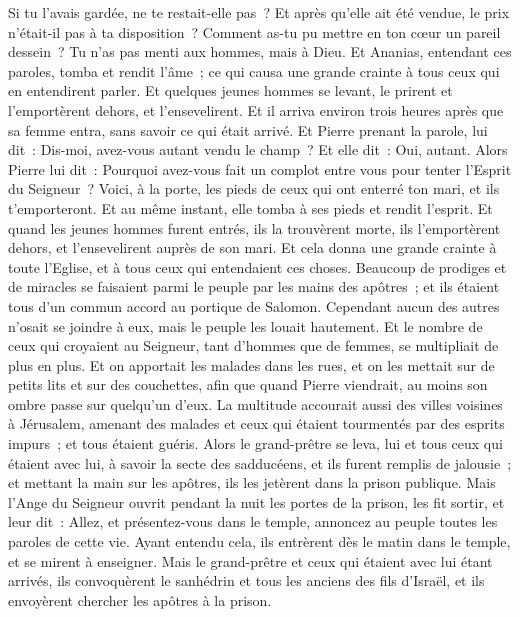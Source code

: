 \begin{multicols}{2}
Si tu l'avais gardée, ne te restait-elle pas~? Et après qu'elle ait été vendue, le prix n'était-il pas à ta disposition~? Comment as-tu pu mettre en ton cœur un pareil dessein~? Tu n'as pas menti aux hommes, mais à Dieu.
Et Ananias, entendant ces paroles, tomba et rendit l'âme~; ce qui causa une grande crainte à tous ceux qui en entendirent parler.
Et quelques jeunes hommes se levant, le prirent et l'emportèrent dehors, et l'ensevelirent.
Et il arriva environ trois heures après que sa femme entra, sans savoir ce qui était arrivé.
Et Pierre prenant la parole, lui dit~: Dis-moi, avez-vous autant vendu le champ~? Et elle dit~: Oui, autant.
Alors Pierre lui dit~: Pourquoi avez-vous fait un complot entre vous pour tenter l'Esprit du Seigneur~? Voici, à la porte, les pieds de ceux qui ont enterré ton mari, et ils t'emporteront.
Et au même instant, elle tomba à ses pieds et rendit l'esprit. Et quand les jeunes hommes furent entrés, ils la trouvèrent morte, ils l'emportèrent dehors, et l'ensevelirent auprès de son mari.
Et cela donna une grande crainte à toute l'Eglise, et à tous ceux qui entendaient ces choses.
Beaucoup de prodiges et de miracles se faisaient parmi le peuple par les mains des apôtres~; et ils étaient tous d'un commun accord au portique de Salomon.
Cependant aucun des autres n'osait se joindre à eux, mais le peuple les louait hautement.
Et le nombre de ceux qui croyaient au Seigneur, tant d'hommes que de femmes, se multipliait de plus en plus.
Et on apportait les malades dans les rues, et on les mettait sur de petits lits et sur des couchettes, afin que quand Pierre viendrait, au moins son ombre passe sur quelqu'un d'eux.
La multitude accourait aussi des villes voisines à Jérusalem, amenant des malades et ceux qui étaient tourmentés par des esprits impurs~; et tous étaient guéris.
Alors le grand-prêtre se leva, lui et tous ceux qui étaient avec lui, à savoir la secte des sadducéens, et ils furent remplis de jalousie~;
et mettant la main sur les apôtres, ils les jetèrent dans la prison publique.
Mais l'Ange du Seigneur ouvrit pendant la nuit les portes de la prison, les fit sortir, et leur dit~:
Allez, et présentez-vous dans le temple, annoncez au peuple toutes les paroles de cette vie.
Ayant entendu cela, ils entrèrent dès le matin dans le temple, et se mirent à enseigner. Mais le grand-prêtre et ceux qui étaient avec lui étant arrivés, ils convoquèrent le sanhédrin et tous les anciens des fils d'Israël, et ils envoyèrent chercher les apôtres à la prison.

\end{multicols}
